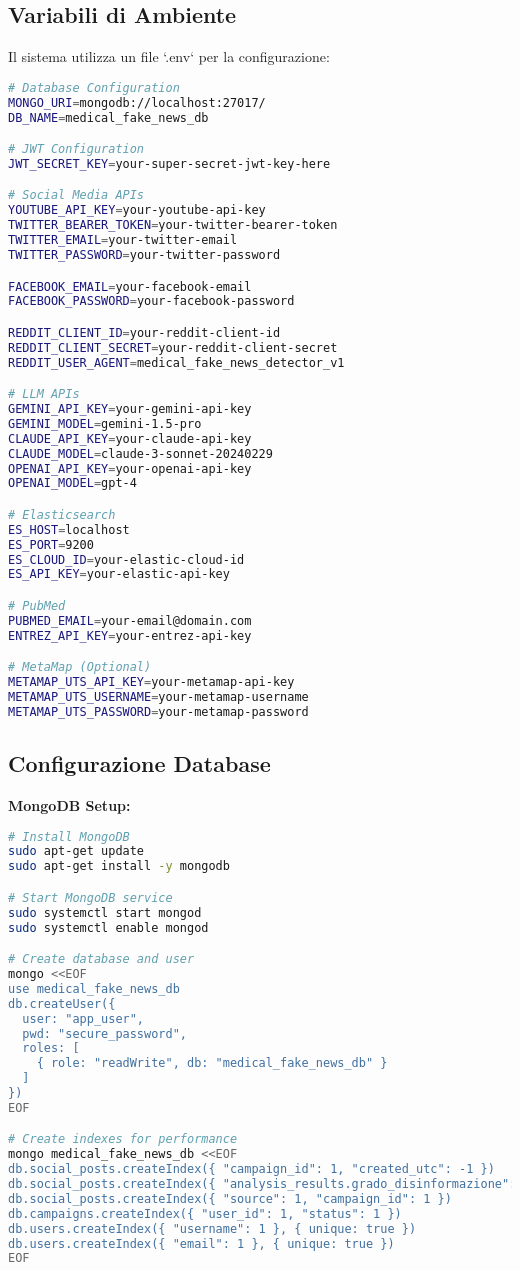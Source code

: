 \documentclass[12pt,a4paper]{report}
\begin{document}
\subsection{Variabili di Ambiente}

Il sistema utilizza un file `.env` per la configurazione:

\begin{lstlisting}[language=bash, caption=Esempio file .env]
# Database Configuration
MONGO_URI=mongodb://localhost:27017/
DB_NAME=medical_fake_news_db

# JWT Configuration
JWT_SECRET_KEY=your-super-secret-jwt-key-here

# Social Media APIs
YOUTUBE_API_KEY=your-youtube-api-key
TWITTER_BEARER_TOKEN=your-twitter-bearer-token
TWITTER_EMAIL=your-twitter-email
TWITTER_PASSWORD=your-twitter-password

FACEBOOK_EMAIL=your-facebook-email
FACEBOOK_PASSWORD=your-facebook-password

REDDIT_CLIENT_ID=your-reddit-client-id
REDDIT_CLIENT_SECRET=your-reddit-client-secret
REDDIT_USER_AGENT=medical_fake_news_detector_v1

# LLM APIs
GEMINI_API_KEY=your-gemini-api-key
GEMINI_MODEL=gemini-1.5-pro
CLAUDE_API_KEY=your-claude-api-key
CLAUDE_MODEL=claude-3-sonnet-20240229
OPENAI_API_KEY=your-openai-api-key
OPENAI_MODEL=gpt-4

# Elasticsearch
ES_HOST=localhost
ES_PORT=9200
ES_CLOUD_ID=your-elastic-cloud-id
ES_API_KEY=your-elastic-api-key

# PubMed
PUBMED_EMAIL=your-email@domain.com
ENTREZ_API_KEY=your-entrez-api-key

# MetaMap (Optional)
METAMAP_UTS_API_KEY=your-metamap-api-key
METAMAP_UTS_USERNAME=your-metamap-username
METAMAP_UTS_PASSWORD=your-metamap-password
\end{lstlisting}

\subsection{Configurazione Database}

\textbf{MongoDB Setup:}

\begin{lstlisting}[language=bash, caption=MongoDB Configuration]
# Install MongoDB
sudo apt-get update
sudo apt-get install -y mongodb

# Start MongoDB service
sudo systemctl start mongod
sudo systemctl enable mongod

# Create database and user
mongo <<EOF
use medical_fake_news_db
db.createUser({
  user: "app_user",
  pwd: "secure_password",
  roles: [
    { role: "readWrite", db: "medical_fake_news_db" }
  ]
})
EOF

# Create indexes for performance
mongo medical_fake_news_db <<EOF
db.social_posts.createIndex({ "campaign_id": 1, "created_utc": -1 })
db.social_posts.createIndex({ "analysis_results.grado_disinformazione": 1 })
db.social_posts.createIndex({ "source": 1, "campaign_id": 1 })
db.campaigns.createIndex({ "user_id": 1, "status": 1 })
db.users.createIndex({ "username": 1 }, { unique: true })
db.users.createIndex({ "email": 1 }, { unique: true })
EOF
\end{lstlisting}
\end{document}
